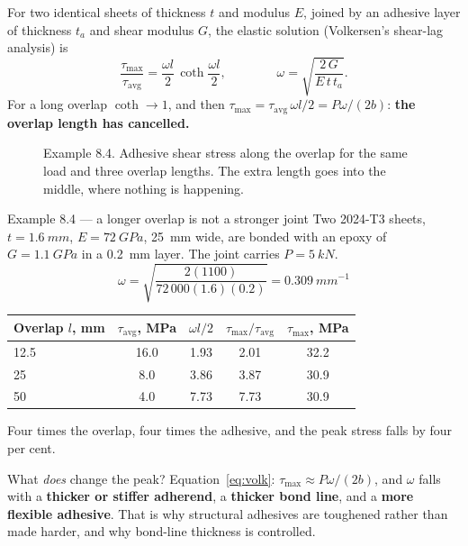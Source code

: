 \documentclass[11pt,a4paper]{article}
\begin{document}
\medskip
For two identical sheets of thickness $t$ and modulus $E$, joined by an adhesive layer of thickness
$t_a$ and shear modulus $G$, the elastic solution (Volkersen's shear-lag analysis) is
\begin{equation}
\frac{\tau_{\max}}{\tau_{\text{avg}}}=\frac{\omega l}{2}\,\coth\!\frac{\omega l}{2},
\qquad\qquad \omega=\sqrt{\frac{2\,G}{E\,t\,t_a}} .
\label{eq:volk}
\end{equation}
For a long overlap $\coth\to1$, and then $\tau_{\max}=\tau_{\text{avg}}\,\omega l/2=P\omega/(2b)$:
\textbf{the overlap length has cancelled.}

\begin{figure}[H]\centering
\resizebox{0.86\textwidth}{!}{}
\caption{Example 8.4. Adhesive shear stress along the overlap for the same load and three overlap
lengths. The extra length goes into the middle, where nothing is happening.}
\label{fig:shearlag}
\end{figure}

\begin{examplebox}{Example 8.4 --- a longer overlap is not a stronger joint}
Two 2024-T3 sheets, $t=\SI{1.6}{mm}$, $E=\SI{72}{GPa}$, \SI{25}{mm} wide, are bonded with an epoxy
of $G=\SI{1.1}{GPa}$ in a \SI{0.2}{mm} layer. The joint carries $P=\SI{5}{kN}$.
\[ \omega=\sqrt{\frac{2(1100)}{72\,000(1.6)(0.2)}}=\SI{0.309}{mm^{-1}} \]

\begin{center}\small
\begin{tabular}{@{}lcccc@{}}
\toprule
Overlap $l$, mm & $\tau_{\text{avg}}$, MPa & $\omega l/2$ & $\tau_{\max}/\tau_{\text{avg}}$ & $\tau_{\max}$, MPa\\
\midrule
12.5 & 16.0 & 1.93 & 2.01 & 32.2\\
25 & 8.0 & 3.86 & 3.87 & 30.9\\
50 & 4.0 & 7.73 & 7.73 & 30.9\\
\bottomrule
\end{tabular}
\end{center}

Four times the overlap, four times the adhesive, and the peak stress falls by four per cent.

\medskip
What \emph{does} change the peak? Equation~\eqref{eq:volk}: $\tau_{\max}\approx P\omega/(2b)$, and
$\omega$ falls with a \textbf{thicker or stiffer adherend}, a \textbf{thicker bond line}, and a
\textbf{more flexible adhesive}. That is why structural adhesives are toughened rather than made
harder, and why bond-line thickness is controlled.
\end{examplebox}
\end{document}
